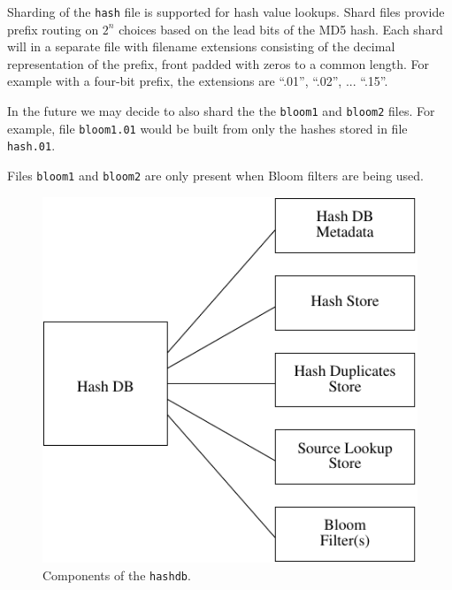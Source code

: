 \documentclass[10pt,twoside]{article}
\newcommand{\hdb}{\texttt{hashdb}\xspace}
\begin{document}
\begin{compactitem}
  \item Sharding of the \texttt{hash} file is supported for hash value lookups.
        Shard files provide prefix routing on \begin{math}2^{n}\end{math} choices based
        on the lead bits of the MD5 hash.
        Each shard will in a separate file with filename extensions consisting of the
        decimal representation of the prefix, front padded with zeros to a common
        length.  For example with a four-bit prefix, the extensions are ``.01'',
        ``.02'', ... ``.15''. 
  \item In the future we may decide to also shard the 
        the \texttt{bloom1} and \texttt{bloom2} files.  For example, file \texttt{bloom1.01}
        would be built from only the hashes stored in file \texttt{hash.01}.
  \item Files \texttt{bloom1} and \texttt{bloom2} are only present when Bloom
        filters are being used.
\end{compactitem}

\begin{figure}[h]
  \center
  \includegraphics{images/hash_db}
  \caption{Components of the \hdb.\label{fig-hashdb}}
\end{figure}
\end{document}
